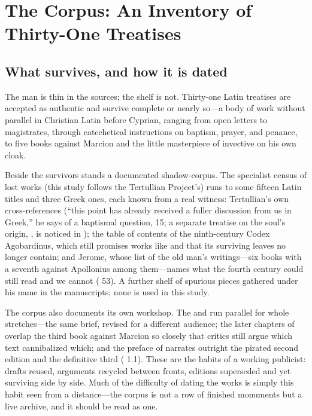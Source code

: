 \section{The Corpus: An Inventory of Thirty-One Treatises}

\subsection{What survives, and how it is dated}

The man is thin in the sources; the shelf is not. Thirty-one Latin treatises
are accepted as authentic and survive complete or nearly so---a body of work
without parallel in Christian Latin before Cyprian, ranging from open letters
to magistrates, through catechetical instructions on baptism, prayer, and
penance, to five books against Marcion and the little masterpiece of
invective on his own cloak.

Beside the survivors stands a documented shadow-corpus. The specialist
census of lost works (this study follows the Tertullian Project's) runs to
some fifteen Latin titles and three Greek ones, each known from a real
witness: Tertullian's own cross-references (``this point has already received
a fuller discussion from us in Greek,'' he says of a baptismal question,
 15; a separate treatise on the soul's origin,
, is noticed in ); the table of
contents of the ninth-century Codex Agobardinus, which still promises works
like  and  that its
surviving leaves no longer contain; and Jerome, whose list of the old man's
writings---six books  with a seventh against Apollonius
among them---names what the fourth century could still read and we cannot
( 53). A further shelf of spurious pieces gathered
under his name in the manuscripts; none is used in this study.

The corpus also documents its own workshop. The  and  run parallel for whole stretches---the same brief, revised for
a different audience; the later chapters of 
overlap the third book against Marcion so closely that critics still argue
which text cannibalized which; and the preface of 
narrates outright the pirated second edition and the definitive third
( 1.1). These are the habits of a working publicist:
drafts reused, arguments recycled between fronts, editions superseded and
yet surviving side by side. Much of the difficulty of dating the works is
simply this habit seen from a distance---the corpus is not a row of finished
monuments but a live archive, and it should be read as one.

